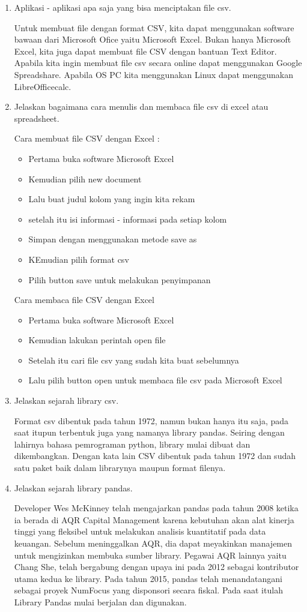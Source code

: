 \begin{enumerate}
\item Aplikasi - aplikasi apa saja yang bisa menciptakan file csv.
\par
	 Untuk membuat file dengan format CSV, kita dapat menggunakan software bawaan dari Microsoft Ofice yaitu Microsoft Excel. Bukan hanya Microsoft Excel, kita juga dapat membuat file CSV dengan bantuan Text Editor. Apabila kita ingin membuat file csv secara online dapat menggunakan Google Spreadshare. Apabila OS PC kita menggunakan Linux dapat menggunakan LibreOfficecalc.

\item Jelaskan bagaimana cara menulis dan membaca file csv di excel atau spreadsheet.
\par
	Cara membuat file CSV dengan Excel :
	\begin{itemize}
		\item Pertama buka software Microsoft Excel
		\item Kemudian pilih new document
		\item Lalu buat judul kolom yang ingin kita rekam
		\item setelah itu isi informasi - informasi pada setiap kolom
		\item Simpan dengan menggunakan metode save as
		\item KEmudian pilih format csv
		\item Pilih button save untuk melakukan penyimpanan
	\end{itemize}
\par
	Cara membaca file CSV dengan Excel
	\begin{itemize}
		\item Pertama buka software Microsoft Excel
		\item Kemudian lakukan perintah open file
		\item Setelah itu cari file csv yang sudah kita buat sebelumnya
		\item Lalu pilih button open untuk membaca file csv pada Microsoft Excel
	\end{itemize}
\item Jelaskan sejarah library csv. 
\par 
	Format csv dibentuk pada tahun 1972, namun bukan hanya itu saja, pada saat itupun terbentuk juga yang namanya library pandas. Seiring dengan lahirnya bahasa pemrograman python, library mulai dibuat dan dikembangkan. Dengan kata lain CSV dibentuk pada tahun 1972 dan sudah satu paket baik dalam librarynya maupun format filenya. 

\item Jelaskan sejarah library pandas.
\par
	Developer Wes McKinney telah mengajarkan pandas pada tahun 2008 ketika ia berada di AQR Capital Management karena kebutuhan akan alat kinerja tinggi yang fleksibel untuk melakukan analisis kuantitatif pada data keuangan. Sebelum meninggalkan AQR, dia dapat meyakinkan manajemen untuk mengizinkan membuka sumber library. Pegawai AQR lainnya yaitu Chang She, telah bergabung dengan upaya ini pada 2012 sebagai kontributor utama kedua ke library. Pada tahun 2015, pandas telah menandatangani sebagai proyek NumFocus yang disponsori secara fiskal. Pada saat itulah Library Pandas mulai berjalan dan digunakan.


\end{enumerate}
